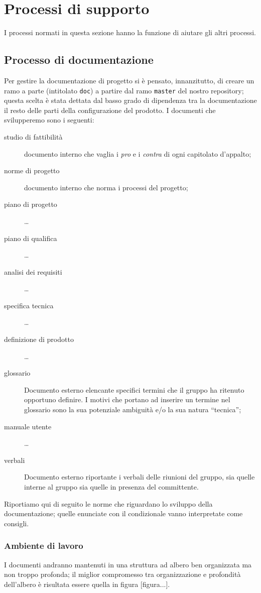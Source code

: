 \section{Processi di supporto}
I processi normati in questa sezione hanno la funzione di aiutare gli altri processi.

\subsection{Processo di documentazione}
Per gestire la documentazione di progetto si è pensato, innanzitutto, di creare un ramo a parte (intitolato \texttt{doc}) a partire dal ramo \texttt{master} del nostro repository; questa scelta è stata dettata dal basso grado di dipendenza tra la documentazione il resto delle parti della configurazione del prodotto. I documenti che svilupperemo sono i seguenti:
\begin{description}
	\item[studio di fattibilità] documento interno che vaglia i \emph{pro} e i \emph{contra} di ogni capitolato d'appalto;
	\item[norme di progetto] documento interno che norma i processi del progetto;
	\item[piano di progetto] \dots
	\item[piano di qualifica] \dots
	\item[analisi dei requisiti] \dots
	\item[specifica tecnica] \dots
	\item[definizione di prodotto] \dots
	\item[glossario] Documento esterno elencante specifici termini che il gruppo ha ritenuto opportuno definire. I motivi che portano ad inserire un termine nel glossario sono la sua potenziale ambiguità e/o la sua natura “tecnica”;
	\item[manuale utente] \dots
	\item[verbali] Documento esterno riportante i verbali delle riunioni del gruppo, sia quelle interne al gruppo sia quelle in presenza del committente.
\end{description}
Riportiamo qui di seguito le norme che riguardano lo sviluppo della documentazione; quelle enunciate con il condizionale vanno interpretate come consigli.

\subsubsection{Ambiente di lavoro} I documenti andranno mantenuti in una struttura ad albero ben organizzata ma non troppo profonda; il miglior compromesso tra organizzazione e profondità dell'albero è risultata essere quella in figura [figura...].

